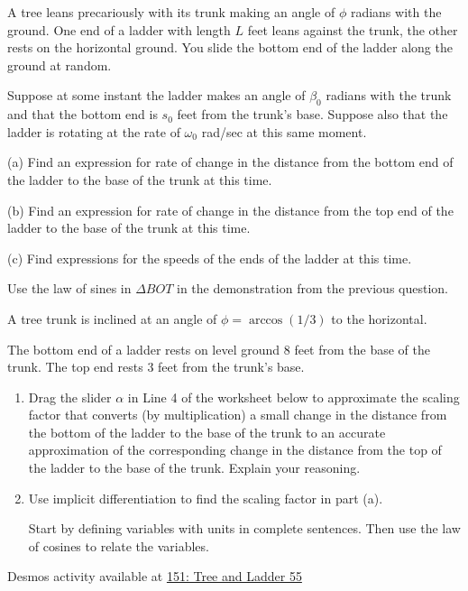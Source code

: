 \documentclass{ximera}
\begin{document}
\begin{question}  \label{Q:KNDMMD}
A tree leans precariously with its trunk making an angle of $\phi$ radians with the ground. One end of a ladder with length $L$ feet leans against the trunk, the other rests on the horizontal ground. You slide the bottom end of the ladder along the ground at random.

Suppose at some instant the ladder makes an angle of $\beta_0$ radians with the trunk and that the bottom end is $s_0$ feet from the trunk's base. Suppose also that the ladder is rotating at the rate of $\omega_0$ rad/sec at this same moment. 

(a) Find an expression for rate of change in the distance from the bottom end of the ladder to the base of the trunk at this time.  

(b) Find an expression for rate of change in the distance from the top end of the ladder to the base of the trunk at this time.

(c) Find expressions for the speeds of the ends of the ladder at this time.

\begin{hint}
Use the law of sines in $\Delta BOT$ in the demonstration from the previous question.
\end{hint} 

\end{question}


\begin{question} \label{Q0f9efe}

A tree trunk is inclined at an angle of $\phi=\arccos(1/3)$ to the horizontal.

The bottom end of a ladder rests on level ground $8$ feet from the base of the trunk. The top end rests $3$ feet from the trunk's base.

\begin{enumerate}
  \item Drag the slider $\alpha$ in Line 4 of the worksheet below to approximate the scaling factor that converts (by multiplication) a small change in the distance from the bottom of the ladder to the base of the trunk to an accurate approximation of the corresponding change in the distance from the top of the ladder to the base of the trunk. Explain your reasoning.

\item Use implicit differentiation to find the scaling factor in part (a).

Start by defining variables with units in complete sentences. Then use the law of cosines to relate the variables.

\end{enumerate}

\begin{onlineOnly}
    \begin{center}
\end{center}
\end{onlineOnly}

Desmos activity available at \href{https://www.desmos.com/calculator/s0des1ty3x}{151: Tree and Ladder 55}




\end{question}
\end{document}
